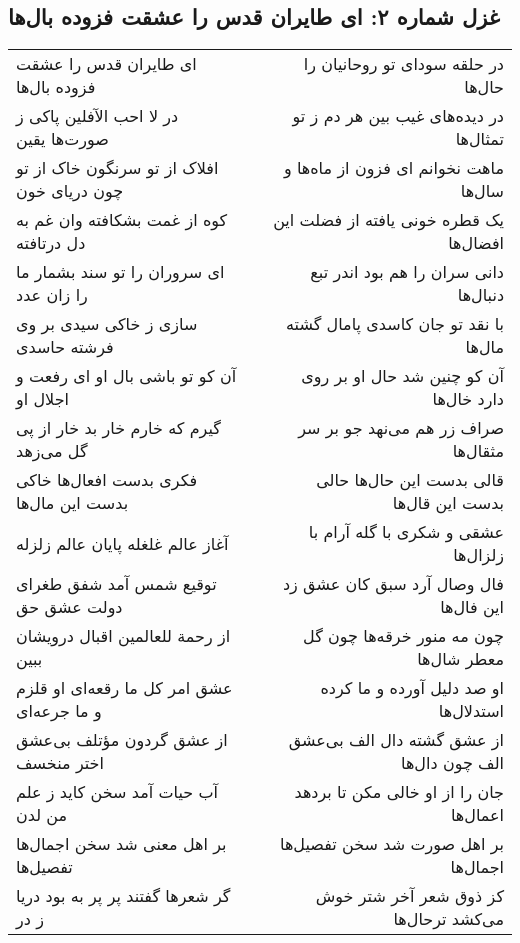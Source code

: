 \begin{center}
\section*{غزل شماره ۲: ای طایران قدس را عشقت فزوده بال‌ها}
\label{sec:0002}
\begin{longtable}{l p{0.5cm} r}
ای طایران قدس را عشقت فزوده بال‌ها
&&
در حلقه سودای تو روحانیان را حال‌ها
\\
در لا احب الآفلین پاکی ز صورت‌ها یقین
&&
در دیده‌های غیب بین هر دم ز تو تمثال‌ها
\\
افلاک از تو سرنگون خاک از تو چون دریای خون
&&
ماهت نخوانم ای فزون از ماه‌ها و سال‌ها
\\
کوه از غمت بشکافته وان غم به دل درتافته
&&
یک قطره خونی یافته از فضلت این افضال‌ها
\\
ای سروران را تو سند بشمار ما را زان عدد
&&
دانی سران را هم بود اندر تبع دنبال‌ها
\\
سازی ز خاکی سیدی بر وی فرشته حاسدی
&&
با نقد تو جان کاسدی پامال گشته مال‌ها
\\
آن کو تو باشی بال او ای رفعت و اجلال او
&&
آن کو چنین شد حال او بر روی دارد خال‌ها
\\
گیرم که خارم خار بد خار از پی گل می‌زهد
&&
صراف زر هم می‌نهد جو بر سر مثقال‌ها
\\
فکری بدست افعال‌ها خاکی بدست این مال‌ها
&&
قالی بدست این حال‌ها حالی بدست این قال‌ها
\\
آغاز عالم غلغله پایان عالم زلزله
&&
عشقی و شکری با گله آرام با زلزال‌ها
\\
توقیع شمس آمد شفق طغرای دولت عشق حق
&&
فال وصال آرد سبق کان عشق زد این فال‌ها
\\
از رحمة للعالمین اقبال درویشان ببین
&&
چون مه منور خرقه‌ها چون گل معطر شال‌ها
\\
عشق امر کل ما رقعه‌ای او قلزم و ما جرعه‌ای
&&
او صد دلیل آورده و ما کرده استدلال‌ها
\\
از عشق گردون مؤتلف بی‌عشق اختر منخسف
&&
از عشق گشته دال الف بی‌عشق الف چون دال‌ها
\\
آب حیات آمد سخن کاید ز علم من لدن
&&
جان را از او خالی مکن تا بردهد اعمال‌ها
\\
بر اهل معنی شد سخن اجمال‌ها تفصیل‌ها
&&
بر اهل صورت شد سخن تفصیل‌ها اجمال‌ها
\\
گر شعرها گفتند پر پر به بود دریا ز در
&&
کز ذوق شعر آخر شتر خوش می‌کشد ترحال‌ها
\\
\end{longtable}
\end{center}
